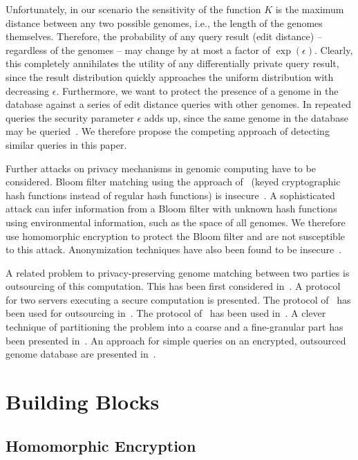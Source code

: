 \documentclass{llncs}
\begin{document}
Unfortunately, in our scenario the sensitivity of the function $K$ is the maximum distance between any two possible genomes, i.e., the length of the genomes themselves.
Therefore, the probability of any query result (edit distance) -- regardless of the genomes -- may change by at most a factor of $\exp(\epsilon)$.
Clearly, this completely annihilates the utility of any differentially private query result, since the result distribution quickly approaches the uniform distribution with decreasing $\epsilon$.
Furthermore, we want to protect the presence of a genome in the database against a series of edit distance queries with other genomes.
In repeated queries the security parameter $\epsilon$ adds up, since the same genome in the database may be queried~\cite{McS09}.
We therefore propose the competing approach of detecting similar queries in this paper.

Further attacks on privacy mechanisms in genomic computing have to be considered.
Bloom filter matching using the approach of~\cite{BelChe04} (keyed cryptographic hash functions instead of regular hash functions) is insecure~\cite{KuzKan11}.
A sophisticated attack can infer information from a Bloom filter with unknown hash functions using environmental information, such as the space of all genomes.
We therefore use homomorphic encryption to protect the Bloom filter and are not susceptible to this attack.
Anonymization techniques have also been found to be insecure~\cite{WanLi09}.

A related problem to privacy-preserving genome matching between two parties is outsourcing of this computation.
This has been first considered in~\cite{AtaLi04}.
A protocol for two servers executing a secure computation is presented.
The protocol of~\cite{TroKat07} has been used for outsourcing in~\cite{BlaAli10}.
The protocol of~\cite{JhaKru08} has been used in~\cite{BlaAta12}.
A clever technique of partitioning the problem into a coarse and a fine-granular part has been presented in~\cite{ChePen12}.
An approach for simple queries on an encrypted, outsourced genome database are presented in~\cite{KanJia08}.

\section{Building Blocks}
\label{sec:blocks}

\subsection{Homomorphic Encryption}
\label{sec:he}
\end{document}
